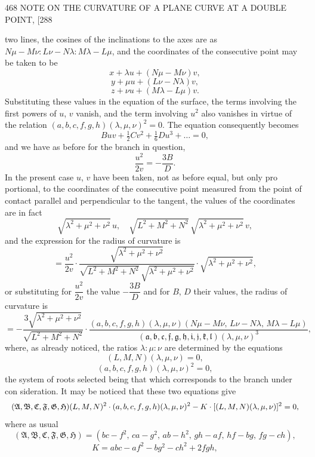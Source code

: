 \documentclass[11pt]{article}
\begin{document}
\begin{center}
468 \hfill NOTE ON THE CURVATURE OF A PLANE CURVE AT A DOUBLE POINT, \hfill \textsc{[288}
\end{center}

two lines, the cosines of the inclinations to the axes are as
$N\mu-M\nu : L\nu-N\lambda : M\lambda-L\mu$,
and the coordinates of the consecutive point may be taken to be
\[ x+\lambda u+(N\mu-M\nu)v, \]
\[ y+\mu u+(L\nu-N\lambda)v, \]
\[ z+\nu u+(M\lambda-L\mu)v. \]
Substituting these values in the equation of the surface, the terms involving the first
powers of $u$, $v$ vanish, and the term involving $u^{2}$ also vanishes in virtue of the relation
$(a,b,c,f,g,h)(\lambda,\mu,\nu)^{2}=0$. The equation consequently becomes
\[ Buv+\tfrac{1}{2}Cv^{2}+\tfrac{1}{6}Du^{3}+\ldots =0, \]
and we have as before for the branch in question,
\[ \frac{u^{2}}{2v}=-\frac{3B}{D}. \]
In the present case $u$, $v$ have been taken, not as before equal, but only pro\-
portional, to the coordinates of the consecutive point measured from the point of
contact parallel and perpendicular to the tangent, the values of the coordinates are in
fact
\[ \sqrt{\lambda^{2}+\mu^{2}+\nu^{2}}\, u,\quad \sqrt{L^{2}+M^{2}+N^{2}}\,\sqrt{\lambda^{2}+\mu^{2}+\nu^{2}}\, v, \]
and the expression for the radius of curvature is
\[ =\frac{u^{2}}{2v}\cdot\frac{\sqrt{\lambda^{2}+\mu^{2}+\nu^{2}}}{\sqrt{L^{2}+M^{2}+N^{2}}\,\sqrt{\lambda^{2}+\mu^{2}+\nu^{2}}}\cdot\sqrt{\lambda^{2}+\mu^{2}+\nu^{2}}, \]
or substituting for $\dfrac{u^{2}}{2v}$ the value $-\dfrac{3B}{D}$ and for $B$, $D$ their values, the radius of
curvature is
\[ =-\frac{3\sqrt{\lambda^{2}+\mu^{2}+\nu^{2}}}{\sqrt{L^{2}+M^{2}+N^{2}}}\cdot\frac{(a,b,c,f,g,h)(\lambda,\mu,\nu)(N\mu-M\nu,\,L\nu-N\lambda,\,M\lambda-L\mu)}{(\mathfrak{a},\mathfrak{b},\mathfrak{c},\mathfrak{f},\mathfrak{g},\mathfrak{h},\mathfrak{i},\mathfrak{j},\mathfrak{k},\mathfrak{l})(\lambda,\mu,\nu)^{3}}, \]
where, as already noticed, the ratios $\lambda:\mu:\nu$ are determined by the equations
\[ (L,M,N)(\lambda,\mu,\nu)=0, \]
\[ (a,b,c,f,g,h)(\lambda,\mu,\nu)^{2}=0, \]
the system of roots selected being that which corresponds to the branch under con\-
sideration. It may be noticed that these two equations give
\[ \resizebox{\textwidth}{!}{$\displaystyle
(\mathfrak{A},\mathfrak{B},\mathfrak{C},\mathfrak{F},\mathfrak{G},\mathfrak{H})(L,M,N)^{2}\cdot (a,b,c,f,g,h)(\lambda,\mu,\nu)^{2} - K\cdot [(L,M,N)(\lambda,\mu,\nu)]^{2}=0,
$} \]
where as usual
\[ (\mathfrak{A},\mathfrak{B},\mathfrak{C},\mathfrak{F},\mathfrak{G},\mathfrak{H})=(bc-f^{2},\, ca-g^{2},\, ab-h^{2},\, gh-af,\, hf-bg,\, fg-ch), \]
\[ K=abc-af^{2}-bg^{2}-ch^{2}+2fgh, \]
\end{document}
